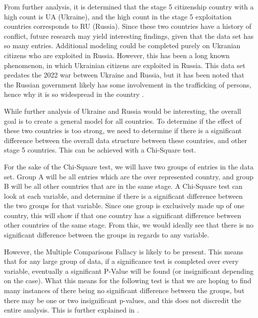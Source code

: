 \documentclass{article} %
\begin{document}
From further analysis, it is determined that the stage 5 citizenship country with a high count is UA (Ukraine), and the high count in the stage 5 exploitation countries corresponds to RU (Russia). Since these two countries have a history of conflict, future research may yield interesting findings, given that the data set has so many entries. Additional modeling could be completed purely on Ukranian citizens who are exploited in Russia. However, this has been a long known phenomenon, in which Ukrainian citizens are exploited in Russia. This data set predates the 2022 war between Ukraine and Russia, but it has been noted that the Russian government likely has some involvement in the trafficking of persons, hence why it is so widespread in the country \parencite{RussiaTrafficking}.

While further analysis of Ukraine and Russia would be interesting, the overall goal is to create a general model for all countries. To determine if the effect of these two countries is too strong, we need to determine if there is a significant difference between the overall data structure between these countries, and other stage 5 countries. This can be achieved with a Chi-Square test.

For the sake of the Chi-Square test, we will have two groups of entries in the data set. Group A will be all entries which are the over represented country, and group B will be all other countries that are in the same stage. A Chi-Square test can look at each variable, and determine if there is a significant difference between the two groups for that variable. Since one group is exclusively made up of one country, this will show if that one country has a significant difference between other countries of the same stage. From this, we would ideally see that there is no significant difference between the groups in regards to any variable. 

However, the Multiple Comparisons Fallacy is likely to be present. This means that for any large group of data, if a significance test is completed over every variable, eventually a significant P-Value will be found (or insignificant depending on the case). What this means for the following test is that we are hoping to find many instances of there being no significant difference between the groups, but there may be one or two insignificant p-values, and this does not discredit the entire analysis. This is further explained in \cite{Fallacy}.
\end{document}
